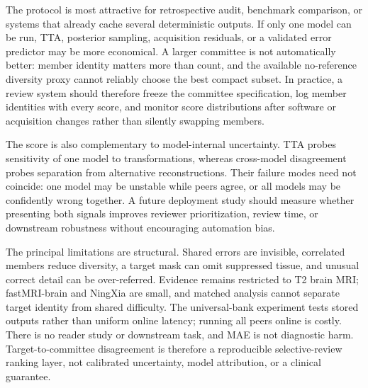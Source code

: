 \documentclass{article}
\begin{document}
The protocol is most attractive for retrospective audit, benchmark comparison, or systems that already cache several deterministic outputs. If only one model can be run, TTA, posterior sampling, acquisition residuals, or a validated error predictor may be more economical. A larger committee is not automatically better: member identity matters more than count, and the available no-reference diversity proxy cannot reliably choose the best compact subset. In practice, a review system should therefore freeze the committee specification, log member identities with every score, and monitor score distributions after software or acquisition changes rather than silently swapping members.

The score is also complementary to model-internal uncertainty. TTA probes sensitivity of one model to transformations, whereas cross-model disagreement probes separation from alternative reconstructions. Their failure modes need not coincide: one model may be unstable while peers agree, or all models may be confidently wrong together. A future deployment study should measure whether presenting both signals improves reviewer prioritization, review time, or downstream robustness without encouraging automation bias.

The principal limitations are structural. Shared errors are invisible, correlated members reduce diversity, a target mask can omit suppressed tissue, and unusual correct detail can be over-referred. Evidence remains restricted to T2 brain MRI; fastMRI-brain and NingXia are small, and matched analysis cannot separate target identity from shared difficulty. The universal-bank experiment tests stored outputs rather than uniform online latency; running all peers online is costly. There is no reader study or downstream task, and MAE is not diagnostic harm. Target-to-committee disagreement is therefore a reproducible selective-review ranking layer, not calibrated uncertainty, model attribution, or a clinical guarantee.

\clearpage


\end{document}
